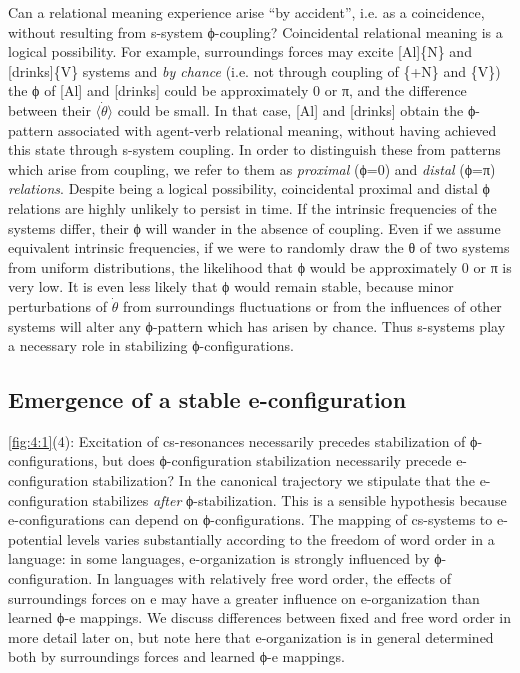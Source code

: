   Can a relational meaning experience arise “by accident”, i.e. as a coincidence, without resulting from s-system ϕ-coupling? Coincidental relational meaning is a logical possibility. For example, surroundings forces may excite [Al]\{N\} and [drinks]\{V\} systems and \textit{by chance} (i.e. not through coupling of \{+N\} and \{V\}) the ϕ of [Al] and [drinks] could be approximately 0 or π, and the difference between their $\langle\dot{\theta}\rangle$ could be small. In that case, [Al] and [drinks] obtain the ϕ-pattern associated with agent-verb relational meaning, without having achieved this state through s-system coupling. In order to distinguish these from patterns which arise from coupling, we refer to them as \textit{proximal} (ϕ=0) and \textit{distal} (ϕ=π) \textit{relations}. Despite being a logical possibility, coincidental proximal and distal ϕ relations are highly unlikely to persist in time. If the intrinsic frequencies of the systems differ, their ϕ will wander in the absence of coupling. Even if we assume equivalent intrinsic frequencies, if we were to randomly draw the θ of two systems from uniform distributions, the likelihood that ϕ would be approximately 0 or π is very low. It is even less likely that ϕ would remain stable, because minor perturbations of $\dot{\theta}$ from surroundings fluctuations or from the influences of other systems will alter any ϕ-pattern which has arisen by chance. Thus s-systems play a necessary role in stabilizing ϕ-configurations.

\subsection{Emergence of a stable e-configuration}

\ref{fig:4:1}(4): Excitation of cs-resonances necessarily precedes stabilization of ϕ-configurations, but does ϕ-configuration stabilization necessarily precede e-configuration stabilization? In the canonical trajectory we stipulate that the e-configuration stabilizes \textit{after} ϕ-stabilization. This is a sensible hypothesis because e-configurations can depend on ϕ-configurations. The mapping of cs-systems to e-potential levels varies substantially according to the freedom of word order in a language: in some languages, e-organization is strongly influenced by ϕ-configuration. In languages with relatively free word order, the effects of surroundings forces on e may have a greater influence on e-organization than learned ϕ-e mappings. We discuss differences between fixed and  free word order in more detail later on, but note here that e-organization is in general determined both by surroundings forces and learned ϕ-e mappings.

